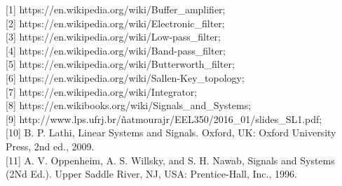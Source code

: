 \documentclass[a4paper, 12pt]{article}
\begin{document}
	[1] https://en.wikipedia.org/wiki/Buffer\_amplifier; \\

	[2] https://en.wikipedia.org/wiki/Electronic\_filter;\\

	[3] https://en.wikipedia.org/wiki/Low-pass\_filter;\\

	[4] https://en.wikipedia.org/wiki/Band-pass\_filter;\\

	[5] https://en.wikipedia.org/wiki/Butterworth\_filter;\\

	[6] https://en.wikipedia.org/wiki/Sallen-Key\_topology;\\

	[7] https://en.wikipedia.org/wiki/Integrator;\\

	[8] https://en.wikibooks.org/wiki/Signals\_and\_Systems;\\

	[9] http://www.lps.ufrj.br/\~natmourajr/EEL350/2016\_01/slides\_SL1.pdf; \\

	[10] B. P. Lathi, Linear Systems and Signals. Oxford, UK: Oxford University Press, 2nd ed., 2009. \\

	[11] A. V. Oppenheim, A. S. Willsky, and S. H. Nawab, Signals and Systems (2Nd Ed.). Upper Saddle River, NJ, USA: Prentice-Hall, Inc., 1996.
\end{document}
